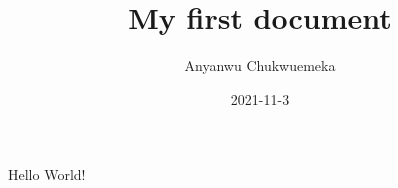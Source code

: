 \documentclass{article}
\title{My first document}
\date{2021-11-3}
\author{Anyanwu Chukwuemeka }
\begin{document}
	\maketitle
	\newpage
	Hello World!
\end{document}
